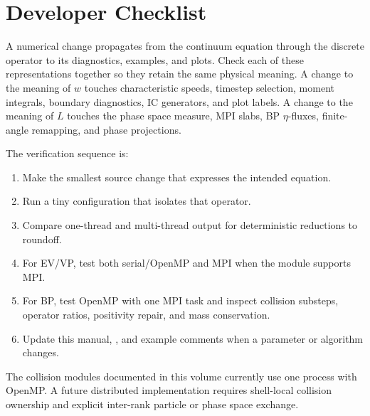 \documentclass[11pt]{article}
\begin{document}
\section{Developer Checklist}

A numerical change propagates from the continuum equation through the
discrete operator to its diagnostics, examples, and plots. Check each of
these representations together so they retain the same physical meaning.  A change to the
meaning of \(w\) touches characteristic speeds, timestep selection, moment
integrals, boundary diagnostics, IC generators, and plot labels.  A change to
the meaning of \(L\) touches the phase space measure, MPI slabs, BP
\(\eta\)-fluxes, finite-angle remapping, and phase projections.

The verification sequence is:
\begin{enumerate}[itemsep=0pt,parsep=0pt,topsep=0.4em]
\item Make the smallest source change that expresses the intended equation.
\item Run a tiny configuration that isolates that operator.
\item Compare one-thread and multi-thread output for deterministic reductions
to roundoff.
\item For EV/VP, test both serial/OpenMP and MPI when the module supports MPI.
\item For BP, test OpenMP with one MPI task and inspect collision substeps,
operator ratios, positivity repair, and mass conservation.
\item Update this manual, , and example comments when a
parameter or algorithm changes.
\end{enumerate}

The collision modules documented in this volume currently use one process
with OpenMP.  A future distributed implementation requires shell-local
collision ownership and explicit inter-rank particle or phase space exchange.




\end{document}
